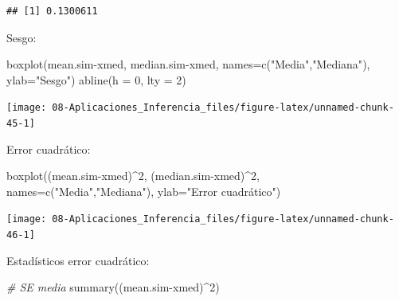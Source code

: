 \documentclass[
]{book}
\newenvironment{Shaded}{\begin{snugshade}}{\end{snugshade}}
\newcommand{\AttributeTok}[1]{\textcolor[rgb]{0.77,0.63,0.00}{#1}}
\newcommand{\CommentTok}[1]{\textcolor[rgb]{0.56,0.35,0.01}{\textit{#1}}}
\newcommand{\DecValTok}[1]{\textcolor[rgb]{0.00,0.00,0.81}{#1}}
\newcommand{\FunctionTok}[1]{\textcolor[rgb]{0.00,0.00,0.00}{#1}}
\newcommand{\NormalTok}[1]{#1}
\newcommand{\SpecialCharTok}[1]{\textcolor[rgb]{0.00,0.00,0.00}{#1}}
\newcommand{\StringTok}[1]{\textcolor[rgb]{0.31,0.60,0.02}{#1}}
\theoremstyle{break}
\theoremstyle{definition}
\theoremstyle{definition}
\theoremstyle{definition}
\theoremstyle{definition}
\theoremstyle{remark}
\begin{document}
\begin{enumerate}
\begin{verbatim}
## [1] 0.1300611
\end{verbatim}

  Sesgo:

\begin{Shaded}
\begin{Highlighting}[]
\FunctionTok{boxplot}\NormalTok{(mean.sim}\SpecialCharTok{{-}}\NormalTok{xmed, median.sim}\SpecialCharTok{{-}}\NormalTok{xmed, }
      \AttributeTok{names=}\FunctionTok{c}\NormalTok{(}\StringTok{"Media"}\NormalTok{,}\StringTok{"Mediana"}\NormalTok{), }\AttributeTok{ylab=}\StringTok{"Sesgo"}\NormalTok{)}
\FunctionTok{abline}\NormalTok{(}\AttributeTok{h =} \DecValTok{0}\NormalTok{, }\AttributeTok{lty =} \DecValTok{2}\NormalTok{)}
\end{Highlighting}
\end{Shaded}

  \begin{center}\texttt{[image: 08-Aplicaciones\_Inferencia\_files/figure-latex/unnamed-chunk-45-1]} \end{center}

  Error cuadrático:

\begin{Shaded}
\begin{Highlighting}[]
\FunctionTok{boxplot}\NormalTok{((mean.sim}\SpecialCharTok{{-}}\NormalTok{xmed)}\SpecialCharTok{\^{}}\DecValTok{2}\NormalTok{, (median.sim}\SpecialCharTok{{-}}\NormalTok{xmed)}\SpecialCharTok{\^{}}\DecValTok{2}\NormalTok{, }
      \AttributeTok{names=}\FunctionTok{c}\NormalTok{(}\StringTok{"Media"}\NormalTok{,}\StringTok{"Mediana"}\NormalTok{), }\AttributeTok{ylab=}\StringTok{"Error cuadrático"}\NormalTok{)}
\end{Highlighting}
\end{Shaded}

  \begin{center}\texttt{[image: 08-Aplicaciones\_Inferencia\_files/figure-latex/unnamed-chunk-46-1]} \end{center}

  Estadísticos error cuadrático:

\begin{Shaded}
\begin{Highlighting}[]
\CommentTok{\# SE media}
\FunctionTok{summary}\NormalTok{((mean.sim}\SpecialCharTok{{-}}\NormalTok{xmed)}\SpecialCharTok{\^{}}\DecValTok{2}\NormalTok{) }
\end{Highlighting}
\end{Shaded}


\end{enumerate}
\end{document}
